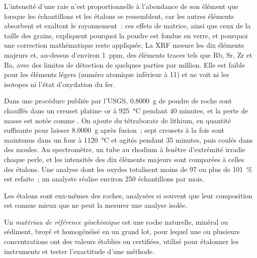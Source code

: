 L'intensité d'une raie n'est proportionnelle à l'abondance de son élément que lorsque les échantillons et les
étalons se ressemblent, car les autres éléments absorbent et exaltent le rayonnement~: ces effets de matrice,
ainsi que ceux de la taille des grains, expliquent pourquoi la poudre est fondue en verre, et pourquoi une
correction mathématique reste appliquée. La XRF mesure les dix éléments majeurs et, au-dessus d'environ \qty{1}{ppm},
des éléments traces tels que Rb, Sr, Zr et Ba, avec des limites de détection de quelques parties par million. Elle est
faible pour les éléments légers (numéro atomique inférieur à 11) et ne voit ni les isotopes
ni l'état d'oxydation du fer.

\begin{inthelab}
Dans une procédure publiée par l'USGS, \qty{0.8000}{g} de poudre de roche sont chauffés dans un creuset platine--or
à \qty{925}{\celsius} pendant 40 minutes, et la perte de masse est notée comme . On ajoute du tétraborate
de lithium, en quantité suffisante pour laisser \qty{8.0000}{g} après fusion~; sept creusets à la fois sont maintenus
dans un four à \qty{1120}{\celsius} et agités pendant 35 minutes, puis coulés dans des moules. Au spectromètre,
un tube au rhodium à fenêtre d'extrémité irradie chaque perle, et les intensités des dix éléments majeurs sont comparées
à celles des étalons. Une analyse dont les oxydes totalisent moins de 97 ou plus de \qty{101}{\percent} est refaite~;
un analyste réalise environ
250 échantillons par mois.
\end{inthelab}

Les étalons sont eux-mêmes des roches, analysées si souvent que leur composition est connue mieux que
ne peut la mesurer une analyse isolée.

\begin{definition}\label{def:b2:field-lab-methods-2:rm}
Un \emph{matériau de référence géochimique} est une roche naturelle,
minéral ou sédiment, broyé et homogénéisé en un grand lot, pour lequel une ou plusieurs concentrations ont des valeurs établies
ou certifiées, utilisé pour étalonner les instruments
et tester l'exactitude d'une méthode.
\end{definition}

